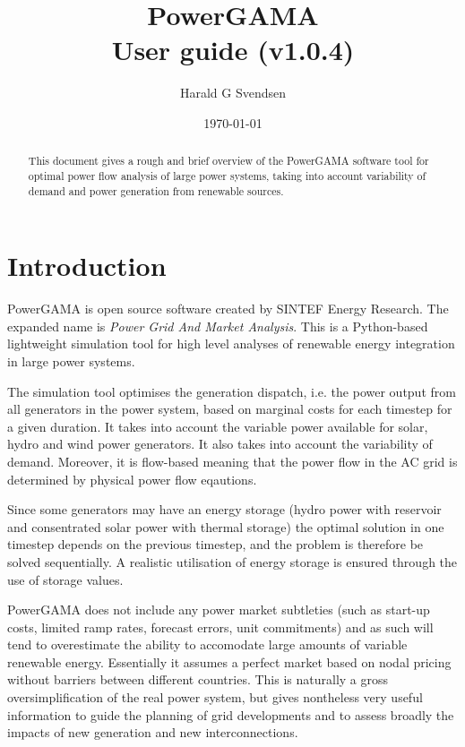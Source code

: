 \documentclass{article}
\title{PowerGAMA\\User guide (v1.0.4)}
\author{Harald G Svendsen}
\date{\today}
\begin{document}
\maketitle

\begin{abstract}
This document gives a rough and brief overview of the PowerGAMA software tool for optimal power flow analysis of large power systems, taking into account variability of demand and power generation from renewable sources.
\end{abstract}

\tableofcontents


\newpage
\section{Introduction}
PowerGAMA is open source software created by SINTEF Energy Research. The expanded name is \emph{Power Grid And Market Analysis}. This is a Python-based  lightweight simulation tool for high level analyses of renewable energy integration in large power systems.

The simulation tool optimises the generation dispatch, i.e. the power output from all generators in the power system, based on marginal costs for each timestep for a given duration.  It takes into account the variable power available for solar, hydro and wind power generators. It also takes into account the variability of demand. Moreover, it is flow-based meaning that the power flow in the AC grid is determined by physical power flow eqautions. 

Since some generators may have an energy storage (hydro power with reservoir and consentrated solar power with thermal storage) the optimal solution in one timestep depends on the previous timestep, and the problem is  therefore be solved sequentially.  A realistic utilisation of energy storage is ensured through the use of storage values.


PowerGAMA does not include any power market subtleties (such as start-up costs, limited ramp rates, forecast errors, unit commitments) and as such will tend to overestimate the ability to accomodate large amounts of variable renewable energy. Essentially it assumes a perfect market based on nodal pricing without barriers between different countries. This is naturally a gross oversimplification of the real power system, but gives nontheless very useful information to guide the planning of grid developments and to assess broadly the impacts of new generation and new interconnections.
\end{document}
